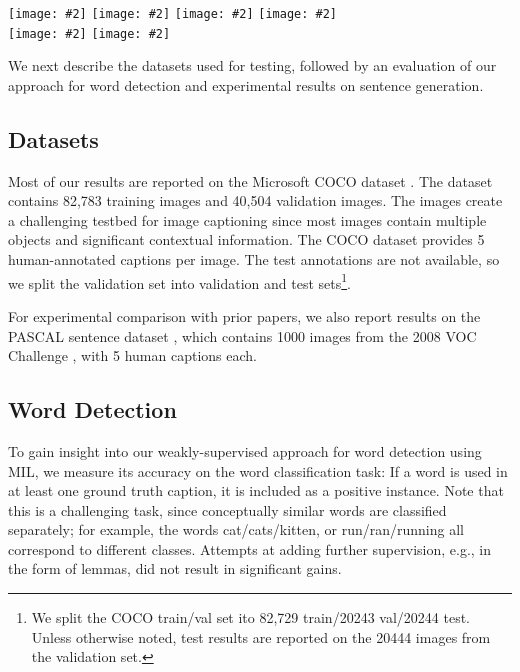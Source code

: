 \documentclass[10pt,twocolumn,letterpaper]{article}
\newcommand{\insertH}[2]{\texttt{[image: \#2]}}
\newcommand{\insertW}[2]{\texttt{[image: \#2]}}
\begin{document}
\begin{figure*}
\centering
 \insertH{0.17}{{coco-vis/v3/582015-test.all-341084}.jpg} 
 \insertH{0.17}{{coco-vis/v3/725998-test.all-225364}.jpg} 
 \insertH{0.17}{{coco-vis/v3/691878-test.all-177607}.jpg} 
 \insertH{0.17}{{coco-vis/v3/559717-test.all-356511}.jpg} \\
 \insertW{.9}{{coco-vis/v4/295483-test.all-285789}.jpg}
 \insertW{.9}{{coco-vis/v4/923025-test.all-326916}.jpg}
 \caption{Qualitative results for several randomly chosen images on the Microsoft COCO dataset, with our generated caption (black) and a human caption (blue) for each image. In the bottom two rows we show localizations for the words used in the sentences. More examples can be found on the project website.}
\label{fig:qual}
\vspace{-1em}
\end{figure*}

We next describe the datasets used for testing, followed by an evaluation of our approach for word detection and experimental results on sentence generation.

\subsection{Datasets}

Most of our results are reported on the Microsoft COCO dataset \cite{linECCV14,capeval2015}. The dataset contains 82,783 training images and 40,504 validation images. The images create a challenging testbed for image captioning since most images contain multiple objects and significant contextual information. The COCO dataset provides 5 human-annotated captions per image. The test annotations are not available, so we split the validation set into validation and test sets\footnote{We split the COCO train/val set ito 82,729 train/20243 val/20244 test. Unless otherwise noted, test results are reported on the 20444 images from the validation set.}.

For experimental comparison with prior papers, we also report results on the PASCAL sentence dataset \cite{Rashtchian2010}, which contains 1000 images from the 2008 VOC Challenge \cite{PASCAL}, with 5 human captions each.

\subsection{Word Detection}

To gain insight into our weakly-supervised approach for word detection using MIL, we measure its accuracy on the word classification task: If a word is used in at least one ground truth caption, it is included as a positive instance. Note that this is a challenging task, since conceptually similar words are classified separately; for example, the words cat/cats/kitten, or run/ran/running all correspond to different classes. Attempts at adding further supervision, e.g., in the form of lemmas, did not result in significant gains.
\end{document}
